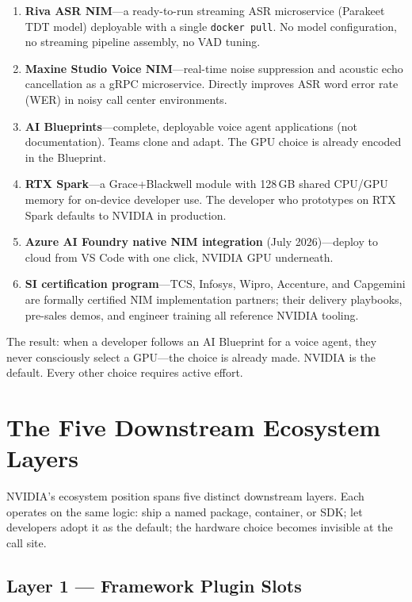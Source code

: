 \documentclass[blind]{gtac}
\begin{document}
\begin{enumerate}
  \item \textbf{Riva ASR NIM}---a ready-to-run streaming ASR microservice (Parakeet TDT model) deployable with a single \texttt{docker pull}. No model configuration, no streaming pipeline assembly, no VAD tuning.
  \item \textbf{Maxine Studio Voice NIM}---real-time noise suppression and acoustic echo cancellation as a gRPC microservice. Directly improves ASR word error rate (WER) in noisy call center environments.
  \item \textbf{AI Blueprints}---complete, deployable voice agent applications (not documentation). Teams clone and adapt. The GPU choice is already encoded in the Blueprint.
  \item \textbf{RTX Spark}---a Grace+Blackwell module with 128\,GB shared CPU/GPU memory for on-device developer use. The developer who prototypes on RTX Spark defaults to NVIDIA in production.
  \item \textbf{Azure AI Foundry native NIM integration} (July 2026)---deploy to cloud from VS Code with one click, NVIDIA GPU underneath.
  \item \textbf{SI certification program}---TCS, Infosys, Wipro, Accenture, and Capgemini are formally certified NIM implementation partners; their delivery playbooks, pre-sales demos, and engineer training all reference NVIDIA tooling.
\end{enumerate}

The result: when a developer follows an AI Blueprint for a voice agent, they never consciously select a GPU---the choice is already made. NVIDIA is the default. Every other choice requires active effort.

\section{The Five Downstream Ecosystem Layers}
\label{sec:downstream}

NVIDIA's ecosystem position spans five distinct downstream layers. Each operates on the same logic: ship a named package, container, or SDK; let developers adopt it as the default; the hardware choice becomes invisible at the call site.

\subsection{Layer 1 --- Framework Plugin Slots}
\end{document}
